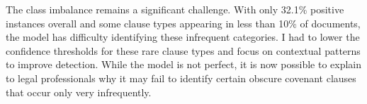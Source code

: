 The class imbalance remains a significant challenge. With only 32.1\% positive instances overall and some clause types appearing in less than 10\% of documents, the model has difficulty identifying these infrequent categories. I had to lower the confidence thresholds for these rare clause types and focus on contextual patterns to improve detection. While the model is not perfect, it is now possible to explain to legal professionals why it may fail to identify certain obscure covenant clauses that occur only very infrequently.
